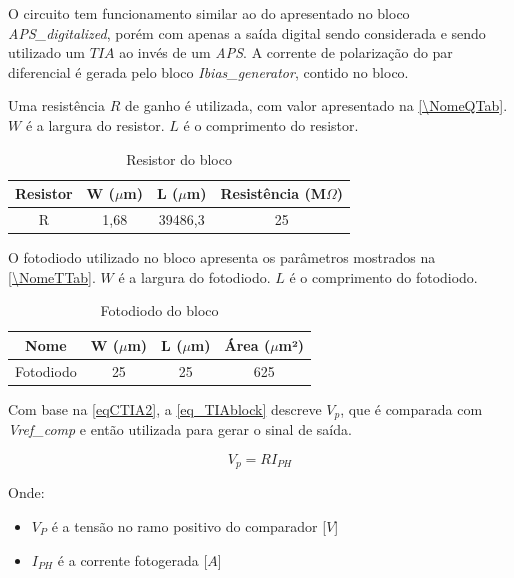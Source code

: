O circuito tem funcionamento similar ao do apresentado no bloco \textit{APS\_digitalized}, por\'em com apenas a sa\'ida digital sendo considerada e sendo utilizado um $TIA$ ao inv\'es de um \textit{APS}. A corrente de polarização do par diferencial \'e gerada pelo bloco \textit{Ibias\_generator}, contido no bloco.

Uma resist\^encia $R$ de ganho \'e utilizada, com valor apresentado na \autoref{\NomeQTab}. $W$ é a largura do resistor. $L$ é o comprimento do resistor.

\begin{table}[!h]
\caption{Resistor do bloco \NomeBloco}
\label{\NomeQTab}
\centering
\begin{tabular}{cccc}
\toprule
Resistor & W ($\mu$m)  & L ($\mu$m) & Resist\^encia (M$\Omega$)\\
\midrule \midrule
R & 1,68 & 39486,3 & 25\\
\bottomrule
\end{tabular}
\end{table}

O fotodiodo utilizado no bloco apresenta os par\^ametros mostrados na \autoref{\NomeTTab}. $W$ é a largura do fotodiodo. $L$ é o comprimento do fotodiodo.

\begin{table}[!h]
\caption{Fotodiodo do bloco \NomeBloco}
\label{\NomeTTab}
\centering
\begin{tabular}{cccc}
\toprule
Nome & W ($\mu$m)  & L ($\mu$m) & Área ($\mu$m²)\\
\midrule \midrule
Fotodiodo & 25 & 25 & 625\\
\bottomrule
\end{tabular}
\end{table}

Com base na \autoref{eqCTIA2}, a \autoref{eq_TIAblock} descreve $V_{p}$, que \'e comparada com \textit{Vref\_comp} e então utilizada para gerar o sinal de sa\'ida.

\begin{equation}
    \label{eq_TIAblock}
    V_{p} = RI_{PH}
\end{equation}

Onde:

\begin{itemize}

    \item \textit{$V_{P}$} \'e a tensão no ramo positivo do comparador [$V$]
    \item \textit{$I_{PH}$} \'e a corrente fotogerada [$A$]
    
\end{itemize}
